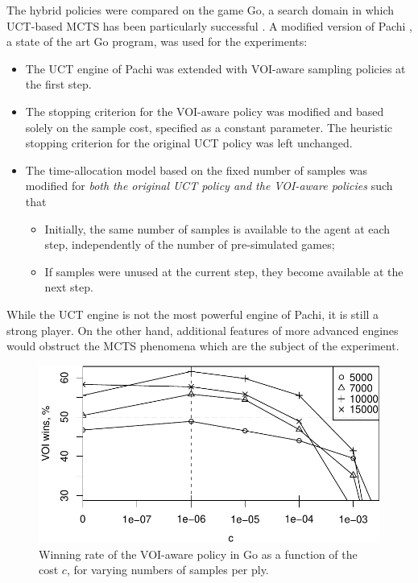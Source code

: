 The hybrid policies were compared on the game Go, a search domain
in which UCT-based MCTS has been particularly successful
\cite{Gelly.mogo}. A modified version of Pachi \cite{Braudis.pachi}, a state of the art
Go program, was used for the experiments:
\begin{itemize}
\item The UCT engine of Pachi was extended with VOI-aware sampling
  policies at the first step. 
\item The stopping criterion for the VOI-aware policy was
  modified and based solely on the sample cost, specified as
  a constant parameter. The heuristic stopping criterion for the
  original UCT policy was left unchanged.
\item The time-allocation model based on the fixed number of samples
  was modified for \textit{both the original UCT policy and the VOI-aware
  policies} such that 
  \begin{itemize}
    \item Initially, the same number of samples is available to
      the agent at each step, independently of the number of pre-simulated
      games;  
    \item If samples were unused at the current step,
      they become available at the next step. 
  \end{itemize}
\end{itemize}
While the UCT engine is not the most powerful engine of Pachi, it is still a strong
player. On the other hand, additional features of more advanced
engines would obstruct the MCTS phenomena which are the subject of
the experiment. 
\begin{figure}[h!]
\centering
\includegraphics[scale=0.55]{mcts-uctvoi.pdf}
\caption{Winning rate of the VOI-aware policy in Go as a function of the cost $c$, for varying numbers of samples per ply.}
\label{fig:uctvoi}
\end{figure}
